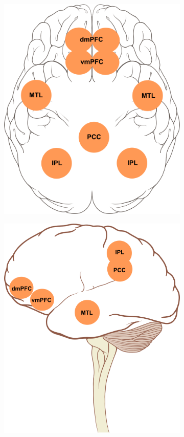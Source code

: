 \documentclass[a4paper, amsfonts, amssymb, amsmath, reprint, showkeys, nofootinbib, twoside]{revtex4-1}
\begin{document}
\begin{figure}[h!]
  \centering
  \begin{subfigure}[b]{0.48\linewidth}
    \includegraphics[width=\linewidth]{images/top-dmn.png}
  \end{subfigure}
  \begin{subfigure}[b]{0.48\linewidth}
    \includegraphics[width=\linewidth]{images/side-dmn.png}

\end{subfigure}
\end{figure}
\end{document}

